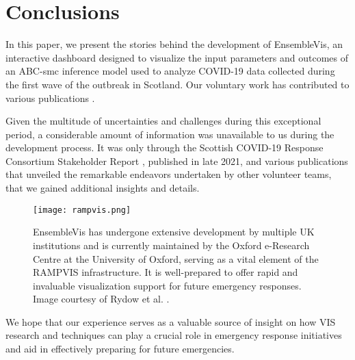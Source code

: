 \section{Conclusions}

In this paper, we present the stories behind the development of EnsembleVis, an interactive dashboard designed to visualize the input parameters and outcomes of an ABC-smc inference model used to analyze COVID-19 data collected during the first wave of the outbreak in Scotland. Our voluntary work has contributed to various publications \cite{chen2022RAMPVIS,dykes2022Visualizationb,khan2022Propagating,khan2022Rapid,rydow2023RAMPVIS}.

Given the multitude of uncertainties and challenges during this exceptional period, a considerable amount of information was unavailable to us during the development process. It was only through the Scottish COVID-19 Response Consortium Stakeholder Report \cite{abdalla2021Scottish}, published in late 2021, and various publications that unveiled the remarkable endeavors undertaken by other volunteer teams, that we gained additional insights and details.

\begin{figure}[tb!]
    \centering
    \texttt{[image: rampvis.png]}
    \caption{EnsembleVis has undergone extensive development by multiple UK institutions and is currently maintained by the Oxford e-Research Centre at the University of Oxford, serving as a vital element of the RAMPVIS infrastructure. It is well-prepared to offer rapid and invaluable visualization support for future emergency responses. Image courtesy of Rydow et al. \cite{rydow2023RAMPVIS}.
    }
    \label{fig:rampvis}

\end{figure}

We hope that our experience serves as a valuable source of insight on how VIS research and techniques can play a crucial role in emergency response initiatives and aid in effectively preparing for future emergencies.